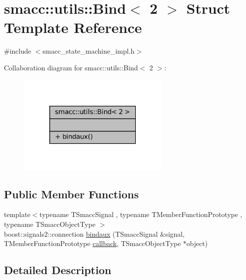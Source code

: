 \hypertarget{structsmacc_1_1utils_1_1Bind_3_012_01_4}{}\section{smacc\+:\+:utils\+:\+:Bind$<$ 2 $>$ Struct Template Reference}
\label{structsmacc_1_1utils_1_1Bind_3_012_01_4}


{\ttfamily \#include $<$smacc\+\_\+state\+\_\+machine\+\_\+impl.\+h$>$}



Collaboration diagram for smacc\+:\+:utils\+:\+:Bind$<$ 2 $>$\+:
\nopagebreak
\begin{figure}[H]
\begin{center}
\leavevmode
\includegraphics[width=211pt]{structsmacc_1_1utils_1_1Bind_3_012_01_4__coll__graph}
\end{center}
\end{figure}
\subsection*{Public Member Functions}
\begin{DoxyCompactItemize}
\item 
{\footnotesize template$<$typename T\+Smacc\+Signal , typename T\+Member\+Function\+Prototype , typename T\+Smacc\+Object\+Type $>$ }\\boost\+::signals2\+::connection \hyperlink{structsmacc_1_1utils_1_1Bind_3_012_01_4_aa9bba43cc8862f00155b17d2625bd99e}{bindaux} (T\+Smacc\+Signal \&signal, T\+Member\+Function\+Prototype \hyperlink{sm__ridgeback__barrel__search__2_2servers_2opencv__perception__node_2opencv__perception__node_8cpp_a050e697bd654facce10ea3f6549669b3}{callback}, T\+Smacc\+Object\+Type $\ast$object)
\end{DoxyCompactItemize}


\subsection{Detailed Description}
